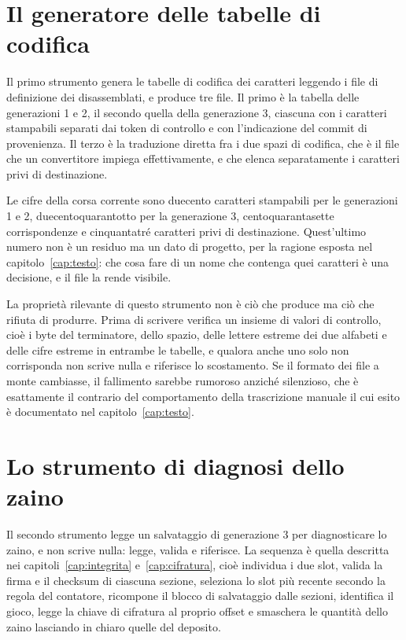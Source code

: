\section{Il generatore delle tabelle di codifica}

Il primo strumento genera le tabelle di codifica dei caratteri leggendo i file di definizione dei disassemblati, e produce tre file. Il primo è la tabella delle generazioni 1 e 2, il secondo quella della generazione 3, ciascuna con i caratteri stampabili separati dai token di controllo e con l'indicazione del commit di provenienza. Il terzo è la traduzione diretta fra i due spazi di codifica, che è il file che un convertitore impiega effettivamente, e che elenca separatamente i caratteri privi di destinazione.

Le cifre della corsa corrente sono duecento caratteri stampabili per le generazioni 1 e 2, duecentoquarantotto per la generazione 3, centoquarantasette corrispondenze e cinquantatré caratteri privi di destinazione. Quest'ultimo numero non è un residuo ma un dato di progetto, per la ragione esposta nel capitolo~\ref{cap:testo}: che cosa fare di un nome che contenga quei caratteri è una decisione, e il file la rende visibile.

La proprietà rilevante di questo strumento non è ciò che produce ma ciò che rifiuta di produrre. Prima di scrivere verifica un insieme di valori di controllo, cioè i byte del terminatore, dello spazio, delle lettere estreme dei due alfabeti e delle cifre estreme in entrambe le tabelle, e qualora anche uno solo non corrisponda non scrive nulla e riferisce lo scostamento. Se il formato dei file a monte cambiasse, il fallimento sarebbe rumoroso anziché silenzioso, che è esattamente il contrario del comportamento della trascrizione manuale il cui esito è documentato nel capitolo~\ref{cap:testo}.

\section{Lo strumento di diagnosi dello zaino}

Il secondo strumento legge un salvataggio di generazione 3 per diagnosticare lo zaino, e non scrive nulla: legge, valida e riferisce. La sequenza è quella descritta nei capitoli~\ref{cap:integrita} e~\ref{cap:cifratura}, cioè individua i due slot, valida la firma e il checksum di ciascuna sezione, seleziona lo slot più recente secondo la regola del contatore, ricompone il blocco di salvataggio dalle sezioni, identifica il gioco, legge la chiave di cifratura al proprio offset e smaschera le quantità dello zaino lasciando in chiaro quelle del deposito.

